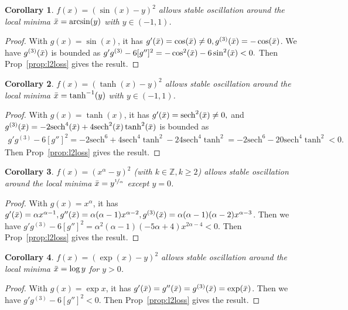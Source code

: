 \documentclass{article}
\theoremstyle{plain}
\newtheorem{coro}{Corollary}
\theoremstyle{remark}
\newcommand{\T}[1]{^{(#1)}}
\begin{document}
\begin{coro}
$f(x)=(\sin(x)-y)^2$ allows stable oscillation around the local minima $\Bar{x}=\arcsin(y)$ with $y\in(-1,1)$.
\label{cor:sin2}
\end{coro}
\begin{proof}
With $g(x)=\sin(x)$, it has $g'(\Bar{x})=\cos(\Bar{x})\neq 0, g\T{3}(\Bar{x})=-\cos(\Bar{x})$. We have $g\T{3}(\Bar{x})$ is bounded as
$g'g\T{3}-6[g'']^2=-\cos^2(\Bar{x})-6\sin^2(\Bar{x})<0.$ Then Prop~\ref{prop:l2loss} gives the result.
\end{proof}

\begin{coro}
$f(x)=(\tanh(x)-y)^2$ allows stable oscillation around the local minima $\Bar{x}=\tanh^{-1}(y)$ with $y\in(-1,1)$.
\label{cor:tanh2}
\end{coro}
\begin{proof}
With $g(x)=\tanh(x)$, it has $g'(\Bar{x})=\text{sech}^2(\Bar{x})\neq 0,
$ and $
g\T{3}(\Bar{x})=-2 \text{sech}^4(\Bar{x}) + 4 \text{sech}^2(\Bar{x}) \tanh^2(\Bar{x})$ is bounded as
\begin{align*}
    g'g\T{3}-6[g'']^2=-2\text{sech}^6+4\text{sech}^4\tanh^2-24\text{sech}^4\tanh^2=-2\text{sech}^6-20\text{sech}^4\tanh^2<0.
\end{align*}
Then Prop~\ref{prop:l2loss} gives the result.
\end{proof}
\begin{coro}
    $f(x)=(x^{\alpha}-y)^2$ (with $k\in\mathbb{Z}, k\ge 2$) allows stable oscillation around the local minima $\Bar{x}=y^{\nicefrac{1}{\alpha}}$ except $y=0$.
    \label{cor:mono}
\end{coro}
\begin{proof}
    With $g(x)=x^{\alpha}$, it has $g'(\Bar{x})=\alpha x^{\alpha-1}, g''(\Bar{x})=\alpha(\alpha-1)x^{\alpha-2}, g^{(3)}(\Bar{x})=\alpha(\alpha-1)(\alpha-2)x^{\alpha-3}$. Then we have $g'g\T{3}-6[g'']^2=\alpha^2(\alpha-1)(-5\alpha+4) x^{2\alpha-4}<0.$ Then Prop~\ref{prop:l2loss} gives the result.
\end{proof}
\begin{coro}
    $f(x)=(\exp(x)-y)^2$ allows stable oscillation around the local minima $\Bar{x}=\log{y}$ for $y>0$.
    \label{cor:exp}
\end{coro}
\begin{proof}
    With $g(x)=\exp{x}$, it has $g'(\Bar{x})=g''(\Bar{x})=g^{(3)}(\Bar{x})=\exp(\Bar{x})$. Then we have $g'g\T{3}-6[g'']^2<0.$ Then Prop~\ref{prop:l2loss} gives the result.
\end{proof}
\end{document}
